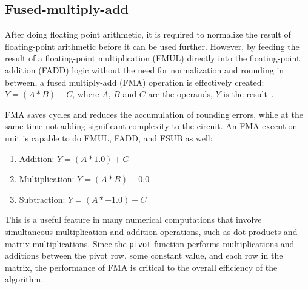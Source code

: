 \documentclass[logo,bsc,singlespacing,parskip]{infthesis}
\newcommand{\pivot}{\texttt{pivot}}
\newenvironment{compactlist}
{ \begin{enumerate}
    \setlength{\itemsep}{0pt}
    \setlength{\parskip}{0pt}
    \setlength{\parsep}{0pt}     
}
{ \end{enumerate} }
\begin{document}
\subsection{Fused-multiply-add}
\label{sec:FMA}

After doing floating point arithmetic, it is required to normalize the result of
floating-point arithmetic before it can be used further. However, by feeding the
result of a floating-point multiplication (FMUL) directly into the
floating-point addition (FADD) logic without the need for normalization and
rounding in between, a fused multiply-add (FMA) operation is effectively
created: 
\begin{math}Y = (A * B) + C \end{math}, where 
\begin{math}A\end{math},
\begin{math}B\end{math} and
\begin{math}C\end{math} are the operands, 
\begin{math}Y\end{math} is the result~\cite{CARD}.

FMA saves cycles and reduces the accumulation of rounding errors, while at the same
time not adding significant complexity to the circuit. An FMA execution unit is
capable to do FMUL, FADD, and FSUB as well: 
\begin{compactlist} 
\item[] Addition: \begin{math}Y = (A * 1.0) + C \end{math} 
\item[] Multiplication: \begin{math} Y = (A * B) + 0.0 \end{math} 
\item[] Subtraction: \begin{math} Y = (A * -1.0) + C\end{math} 
\end{compactlist} 

This is a useful feature in many numerical computations that involve
simultaneous multiplication and addition operations, such as dot products and
matrix multiplications. Since the \pivot{} function performs multiplications and
additions between the pivot row, some constant value, and each row in the matrix,
the performance of FMA is critical to the overall efficiency of the algorithm. 
\end{document}
